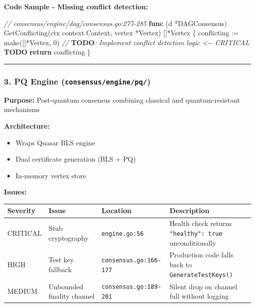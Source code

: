\documentclass[
]{article}
\newenvironment{Shaded}{}{}
\newcommand{\AlertTok}[1]{\textcolor[rgb]{1.00,0.00,0.00}{\textbf{#1}}}
\newcommand{\BuiltInTok}[1]{\textcolor[rgb]{0.00,0.50,0.00}{#1}}
\newcommand{\CommentTok}[1]{\textcolor[rgb]{0.38,0.63,0.69}{\textit{#1}}}
\newcommand{\ControlFlowTok}[1]{\textcolor[rgb]{0.00,0.44,0.13}{\textbf{#1}}}
\newcommand{\DecValTok}[1]{\textcolor[rgb]{0.25,0.63,0.44}{#1}}
\newcommand{\KeywordTok}[1]{\textcolor[rgb]{0.00,0.44,0.13}{\textbf{#1}}}
\newcommand{\NormalTok}[1]{#1}
\newcommand{\OperatorTok}[1]{\textcolor[rgb]{0.40,0.40,0.40}{#1}}
\newcounter{none} %
\providecommand{\tightlist}{%
  \setlength{\itemsep}{0pt}\setlength{\parskip}{0pt}}
\begin{document}
\textbf{Code Sample - Missing conflict detection:}

\begin{Shaded}
\begin{Highlighting}[]
\CommentTok{// consensus/engine/dag/consensus.go:277{-}285}
\KeywordTok{func} \OperatorTok{(}\NormalTok{d }\OperatorTok{*}\NormalTok{DAGConsensus}\OperatorTok{)}\NormalTok{ GetConflicting}\OperatorTok{(}\NormalTok{ctx context}\OperatorTok{.}\NormalTok{Context}\OperatorTok{,}\NormalTok{ vertex }\OperatorTok{*}\NormalTok{Vertex}\OperatorTok{)} \OperatorTok{[]*}\NormalTok{Vertex }\OperatorTok{\{}
\NormalTok{    conflicting }\OperatorTok{:=} \BuiltInTok{make}\OperatorTok{([]*}\NormalTok{Vertex}\OperatorTok{,} \DecValTok{0}\OperatorTok{)}
    \CommentTok{// }\AlertTok{TODO}\CommentTok{: Implement conflict detection logic  \textless{}{-}{-} CRITICAL }\AlertTok{TODO}
    \ControlFlowTok{return}\NormalTok{ conflicting}
\OperatorTok{\}}
\end{Highlighting}
\end{Shaded}

\begin{center}\rule{0.5\linewidth}{0.5pt}\end{center}

\subsubsection{\texorpdfstring{3. PQ Engine
(\texttt{consensus/engine/pq/})}{3. PQ Engine (consensus/engine/pq/)}}\label{3-pq-engine-consensusenginepq}

\textbf{Purpose:} Post-quantum consensus combining classical and
quantum-resistant mechanisms

\textbf{Architecture:}

\begin{itemize}
\tightlist
\item
  Wraps Quasar BLS engine
\item
  Dual certificate generation (BLS + PQ)
\item
  In-memory vertex store
\end{itemize}

\textbf{Issues:}

{\def\LTcaptype{none} %
\begin{longtable}[]{@{}llll@{}}
\toprule\noalign{}
Severity & Issue & Location & Description \\
\midrule\noalign{}
\endhead
\bottomrule\noalign{}
\endlastfoot
CRITICAL & Stub cryptography & \texttt{engine.go:56} & Health check
returns \texttt{"healthy":\ true} unconditionally \\
HIGH & Test key fallback & \texttt{consensus.go:166-177} & Production
code falls back to \texttt{GenerateTestKeys()} \\
MEDIUM & Unbounded finality channel & \texttt{consensus.go:189-201} &
Silent drop on channel full without logging \\
\end{longtable}
}
\end{document}

